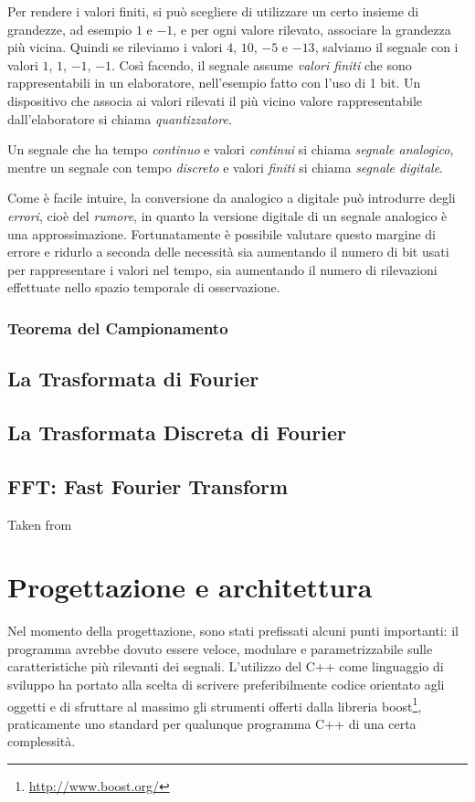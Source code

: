 \documentclass[a4paper,11pt,twoside,openright]{unibo}
\begin{document}
Per rendere i valori finiti, si pu\`o scegliere di utilizzare un certo insieme
di grandezze, ad esempio $1$ e $-1$, e per ogni valore rilevato, associare la
grandezza pi\`u vicina. Quindi se rileviamo i valori $4$, $10$, $-5$ e $-13$,
salviamo il segnale con i valori $1$, $1$, $-1$, $-1$. Cos\`i facendo, il
segnale assume \emph{valori finiti} che sono rappresentabili in un elaboratore,
nell'esempio fatto con l'uso di 1 bit. Un dispositivo che associa ai valori
rilevati il pi\`u vicino valore rappresentabile dall'elaboratore si chiama
\emph{quantizzatore}.

Un segnale che ha tempo \emph{continuo} e valori \emph{continui} si chiama
\emph{segnale analogico}, mentre un segnale con tempo \emph{discreto} e valori
\emph{finiti} si chiama \emph{segnale digitale}.

Come \`e facile intuire, la conversione da analogico a digitale pu\`o introdurre
degli \emph{errori}, cio\`e del \emph{rumore}, in quanto la versione digitale di
un segnale analogico \`e una approssimazione. Fortunatamente \`e possibile
valutare questo margine di errore e ridurlo a seconda delle necessit\`a sia
aumentando il numero di bit usati per rappresentare i valori nel tempo, sia
aumentando il numero di rilevazioni effettuate nello spazio temporale di
osservazione.
\subsection{Teorema del Campionamento}
\section{La Trasformata di Fourier}
\section{La Trasformata Discreta di Fourier}
\section{FFT: Fast Fourier Transform}
Taken from \cite{bertoni}
\chapter{Progettazione e architettura}
\label{outline}
Nel momento della progettazione, sono stati prefissati alcuni punti importanti:
il programma avrebbe dovuto essere veloce, modulare e parametrizzabile sulle
caratteristiche pi\`u rilevanti dei segnali. L'utilizzo del C++ come linguaggio di
sviluppo ha portato alla scelta di scrivere preferibilmente codice orientato
agli oggetti e di sfruttare al massimo gli strumenti offerti dalla libreria
boost\footnote{\url{http://www.boost.org/}}, praticamente uno standard per qualunque programma C++ di una certa
complessit\`a.
\end{document}
